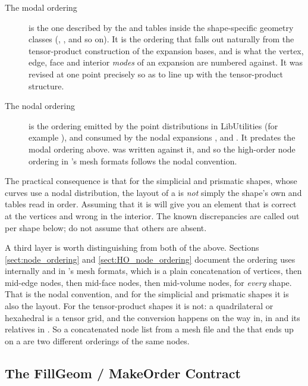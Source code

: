 \begin{description}
\item[The modal ordering] is the one described by the  and
   tables inside the shape-specific geometry classes
  (, , and so on).  It is the ordering that
  falls out naturally from the tensor-product construction of the expansion
  bases, and is what the vertex, edge, face and interior \emph{modes} of an
  expansion are numbered against.  It was revised at one point precisely so as
  to line up with the tensor-product structure.

\item[The nodal ordering] is the ordering emitted by the  point
  distributions in LibUtilities (for example
  ), and consumed by the nodal expansions
  ,  and .
  It predates the modal ordering above.   was written against
  it, and so the high-order node ordering in \nek{}'s mesh formats follows the
  nodal convention.
\end{description}

The practical consequence is that for the simplicial and prismatic shapes,
whose curves use a nodal distribution, the layout of a  is
\emph{not} simply the shape's own  and 
tables read in order.  Assuming that it is will give you an element that is
correct at the vertices and wrong in the interior.  The known discrepancies
are called out per shape below; do not assume that others are absent.

A third layer is worth distinguishing from both of the above.  Sections
\ref{sect:node_ordering} and \ref{sect:HO_node_ordering} document the
ordering  uses internally and in \nek{}'s mesh formats, which
is a plain concatenation of vertices, then mid-edge nodes, then mid-face
nodes, then mid-volume nodes, for \emph{every} shape.  That is the nodal
convention, and for the simplicial and prismatic shapes it is also the
 layout.  For the tensor-product shapes it is not: a
quadrilateral or hexahedral  is a tensor grid, and the conversion
happens on the way in, in  and its relatives in
.  So a concatenated node list from a mesh file
and the  that ends up on a  are two different
orderings of the same nodes.

\subsection{The FillGeom / MakeOrder Contract}
\label{sec:spatialdomains-orderings-contract}

